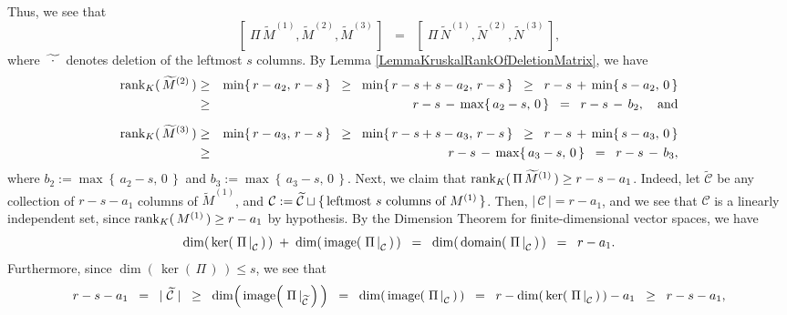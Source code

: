 Thus, we see that
\begin{equation*}
\left[\;\Pi\,\widetilde{M}^{(1)},\widetilde{M}^{(2)},\widetilde{M}^{(3)}\,\right]
\;\; = \;\; \left[\;\Pi\,\widetilde{N}^{(1)},\widetilde{N}^{(2)},\widetilde{N}^{(3)}\,\right],
\end{equation*}
where $\widetilde{{\color{white}\cdot}\cdot{\color{white}\cdot}}$ denotes deletion of the leftmost $s$ columns.
By Lemma \ref{LemmaKruskalRankOfDeletionMatrix}, we have
\begin{eqnarray*}
\rank_{K}(\,\widetilde{M}^{(2)}\,)
& \geq & \min\!\left\{\,r-a_{2},\,r-s\,\right\}
\;\;\geq\;\; \min\!\left\{\,r-s+s-a_{2},\,r-s\,\right\}
\;\;\geq\;\; r-s\,+\,\min\!\left\{\,s-a_{2},\,0\,\right\}
\\
&\geq& r-s\,-\,\max\!\left\{\,a_{2}-s,\,0\,\right\}
\;\; = \;\; r-s \,-\, b_{2},
\quad\textnormal{and}
\\
\rank_{K}(\,\widetilde{M}^{(3)}\,)
& \overset{{\color{white}\vert}}{\geq} & \min\!\left\{\,r-a_{3},\,r-s\,\right\}
\;\;\geq\;\; \min\!\left\{\,r-s+s-a_{3},\,r-s\,\right\}
\;\;\geq\;\; r-s \,+\, \min\!\left\{\,s-a_{3},\,0\,\right\}
\\
&\geq& r-s\,-\,\max\!\left\{\,a_{3}-s,\,0\,\right\}
\;\; = \;\; r-s \,-\, b_{3},
\end{eqnarray*}
where $b_{2} := \max\!\left\{\,a_{2}-s,\,0\,\right\}$ and $b_{3} := \max\!\left\{\,a_{3}-s,\,0\,\right\}$.
Next, we claim that $\textnormal{rank}_{K}(\,\Pi\,\widetilde{M}^{(1)}\,) \geq r - s - a_{1}$.
Indeed, let $\widetilde{\mathcal{C}}$ be any collection of $r - s - a_{1}$ columns of $\widetilde{M}^{(1)}$,
and $\mathcal{C} := \widetilde{\mathcal{C}} \sqcup \{\,\textnormal{leftmost $s$ columns of $M^{(1)}$}\,\}$.
Then, $\left\vert\,\mathcal{C}\,\right\vert = r - a_{1}$, and we see that $\mathcal{C}$ is a linearly independent
set, since $\textnormal{rank}_{K}(\,M^{(1)}\,) \geq r - a_{1}$ by hypothesis.
By the Dimension Theorem for finite-dimensional vector spaces, we have
\begin{equation*}
\dim\!\left(\,\ker\!\left(\,\left.\Pi\,\right\vert_{\mathcal{C}}\,\right)\,\right)
\; + \;
\dim\!\left(\,\textnormal{image}\!\left(\,\left.\Pi\,\right\vert_{\mathcal{C}}\,\right)\,\right)
\;\; = \;\;
\dim\!\left(\,\textnormal{domain}\!\left(\,\left.\Pi\,\right\vert_{\mathcal{C}}\,\right)\,\right)
\;\; = \;\; r - a_{1}.
\end{equation*}
Furthermore, since $\dim\!\left(\,\ker\!\left(\,\Pi\,\right)\,\right) \leq s$, we see that
\begin{equation*}
r - s - a_{1}
\;\; = \;\; \vert\;\widetilde{\mathcal{C}}\;\vert
\;\; \geq \;\; \dim\!\left(\,\textnormal{image}\!\left(\,\left.\Pi\,\right\vert_{\widetilde{\mathcal{C}}}\,\right)\,\right)
\;\; = \;\; \dim\!\left(\,\textnormal{image}\!\left(\,\left.\Pi\,\right\vert_{\mathcal{C}}\,\right)\,\right)
\;\; = \;\; r - \dim\!\left(\,\ker\!\left(\,\left.\Pi\,\right\vert_{\mathcal{C}}\,\right)\,\right) - a_{1}
\;\; \geq \;\; r - s - a_{1},
\end{equation*}
